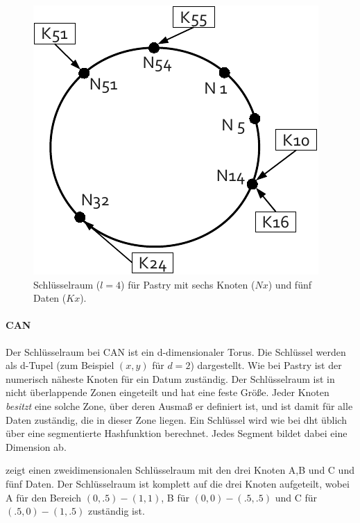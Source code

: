 \begin{figure}[htbp]
\centering
\includegraphics{grafics/pastry_key_space.pdf}
\caption{Schlüsselraum ($l=4$) für Pastry mit sechs Knoten ($Nx$) und fünf Daten ($Kx$).}
\label{fig:pastry_key_space}
\end{figure}


\paragraph{CAN}
Der Schlüsselraum bei CAN \cite{Ratnasamy2001Scalable} ist ein d-dimensionaler Torus. Die Schlüssel werden als d-Tupel (zum Beispiel $(x,y)$ für $d=2$) dargestellt. Wie bei Pastry ist der numerisch näheste Knoten für ein Datum zuständig. Der Schlüsselraum ist in nicht überlappende Zonen eingeteilt und hat eine feste Größe. Jeder Knoten \emph{besitzt} eine solche Zone, über deren Ausmaß er definiert ist, und ist damit für alle Daten zuständig, die in dieser Zone liegen. Ein Schlüssel wird wie bei \ac{dht} üblich über eine segmentierte Hashfunktion berechnet. Jedes Segment bildet dabei eine Dimension ab.

 zeigt einen zweidimensionalen Schlüsselraum mit den drei Knoten A,B und C und fünf Daten. Der Schlüsselraum ist komplett auf die drei Knoten aufgeteilt, wobei A für den Bereich $(0, .5)-(1, 1)$, B für $(0, 0)-(.5, .5)$ und C für $(.5, 0)-(1, .5)$ zuständig ist.

